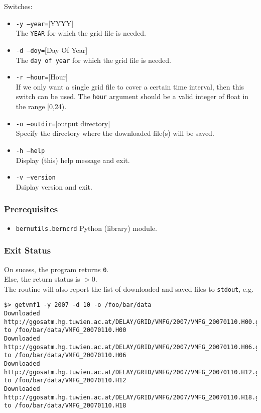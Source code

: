 Switches:
\begin{itemize}
\item \texttt{-y --year=}[YYYY]\\
The \texttt{YEAR} for which the grid file is needed.
\item \texttt{-d --doy=}[Day Of Year]\\
The \texttt{day of year} for which the grid file is needed.
\item \texttt{-r --hour=}[Hour]\\
If we only want a single grid file to cover a certain time interval, then this switch
can be used. The \texttt{hour} argument should be a valid integer of float in the range
[0,24).
\item \texttt{-o --outdir=}[output directory]\\
Specify the directory where the downloaded file(s) will be saved.
\item \texttt{-h --help}\\
Display (this) help message and exit.
\item \texttt{-v --version}\\
Dsiplay version and exit.
\end{itemize}

\subsubsection{Prerequisites}
\begin{itemize}
\item \texttt{bernutils.berncrd} Python (library) module.
\end{itemize}

\subsubsection{Exit Status}
On sucess, the program returns \texttt{0}.\\
Else, the return status is $>$0.\\


The routine will also report the list of downloaded and saved files to \texttt{stdout}, e.g.
\begin{Verbatim}[fontsize=\scriptsize]
$> getvmf1 -y 2007 -d 10 -o /foo/bar/data
Downloaded http://ggosatm.hg.tuwien.ac.at/DELAY/GRID/VMFG/2007/VMFG_20070110.H00.gz to /foo/bar/data/VMFG_20070110.H00
Downloaded http://ggosatm.hg.tuwien.ac.at/DELAY/GRID/VMFG/2007/VMFG_20070110.H06.gz to /foo/bar/data/VMFG_20070110.H06
Downloaded http://ggosatm.hg.tuwien.ac.at/DELAY/GRID/VMFG/2007/VMFG_20070110.H12.gz to /foo/bar/data/VMFG_20070110.H12
Downloaded http://ggosatm.hg.tuwien.ac.at/DELAY/GRID/VMFG/2007/VMFG_20070110.H18.gz to /foo/bar/data/VMFG_20070110.H18
\end{Verbatim}

